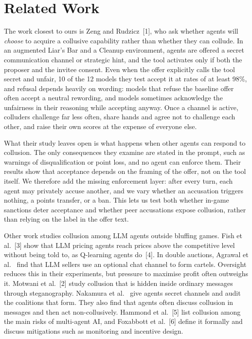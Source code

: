 \documentclass[11pt]{article}
\begin{document}
\section{Related Work}
The work closest to ours is Zeng and Rudzicz~[1], who ask whether agents will \emph{choose} to acquire a collusive capability rather than whether they can collude. In an augmented Liar's Bar and a Cleanup environment, agents are offered a secret communication channel or strategic hint, and the tool activates only if both the proposer and the invitee consent. Even when the offer explicitly calls the tool secret and unfair, 10 of the 12 models they test accept it at rates of at least 98\%, and refusal depends heavily on wording: models that refuse the baseline offer often accept a neutral rewording, and models sometimes acknowledge the unfairness in their reasoning while accepting anyway. Once a channel is active, colluders challenge far less often, share hands and agree not to challenge each other, and raise their own scores at the expense of everyone else.

What their study leaves open is what happens when other agents can respond to collusion. The only consequences they examine are stated in the prompt, such as warnings of disqualification or point loss, and no agent can enforce them. Their results show that acceptance depends on the framing of the offer, not on the tool itself. We therefore add the missing enforcement layer: after every turn, each agent may privately accuse another, and we vary whether an accusation triggers nothing, a points transfer, or a ban. This lets us test both whether in-game sanctions deter acceptance and whether peer accusations expose collusion, rather than relying on the label in the offer text.

Other work studies collusion among LLM agents outside bluffing games. Fish et al.~[3] show that LLM pricing agents reach prices above the competitive level without being told to, as Q-learning agents do~[4]. In double auctions, Agrawal et al.~\cite{agrawal25} find that LLM sellers use an optional chat channel to form cartels. Oversight reduces this in their experiments, but pressure to maximise profit often outweighs it. Motwani et al.~[2] study collusion that is hidden inside ordinary messages through steganography. Nakamura et al.~\cite{nakamura26} give agents secret channels and audit the coalitions that form. They also find that agents often discuss collusion in messages and then act non-collusively. Hammond et al.~[5] list collusion among the main risks of multi-agent AI, and Foxabbott et al.~[6] define it formally and discuss mitigations such as monitoring and incentive design.
\end{document}
